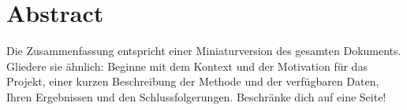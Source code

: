 
\section{Abstract}

Die Zusammenfassung entspricht einer Miniaturversion des gesamten Dokuments. Gliedere sie ähnlich: 
Beginne mit dem Kontext und der Motivation für das Projekt, einer kurzen Beschreibung der Methode und der verfügbaren Daten, 
Ihren Ergebnissen und den Schlussfolgerungen. Beschränke dich auf eine Seite!    